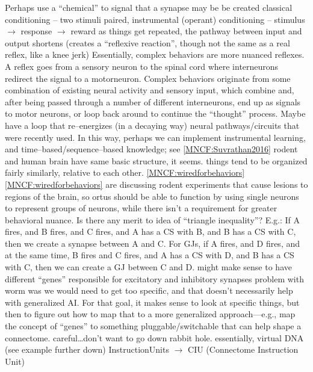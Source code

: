 \documentclass[11pt, a4paper, oneside]{article}   	%
\begin{document}
\begin{outline}
\point Perhaps use a ``chemical'' to signal that a synapse may be be created
\point classical conditioning -- two stimuli paired, instrumental (operant) conditioning -- stimulus $\rightarrow$ response $\rightarrow$ reward
\point as things get repeated, the pathway between input and output shortens (creates a ``reflexive reaction'', though not the same as a real reflex, like a knee jerk)
  \subpoint Essentially, complex behaviors are more nuanced reflexes. A reflex goes from a sensory neuron to the spinal cord where interneurons redirect the signal to a motorneuron. Complex behaviors originate from some combination of existing neural activity and sensory input, which combine and, after being passed through a number of different interneurons, end up as signals to motor neurons, or loop back around to continue the ``thought'' process.
  \point Maybe have a loop that re--energizes (in a decaying way) neural pathways/circuits that were recently used. In this way, perhaps we can implement instrumental learning, and time--based/sequence--based knowledge; see \ref{MNCF:Suvrathan2016}
\point rodent and human brain have same basic structure, it seems. things tend to be organized fairly similarly, relative to each other. \ref{MNCF:wiredforbehaviors}
\point \ref{MNCF:wiredforbehaviors} are discussing rodent experiments that cause lesions to regions of the brain, so ortus should be able to function by using single neurons to represent groups of neurons, while there isn't a requirement for greater behavioral nuance.
\point Is there any merit to idea of  ``triangle inequality''? E.g.:
    \subpoint If A fires, and B fires, and C fires, and A has a CS with B, and B has a CS with C, then we create a synapse between A and C.
    \subpoint For GJs, if A fires, and D fires, and at the same time, B fires and C fires, and A has a CS with D, and B has a CS with C, then we can create a GJ between C and D.
\point might make sense to have different ``genes'' responsible for excitatory and inhibitory synapses
\point problem with worm was we would need to get too specific, and that doesn't necessarily help with generalized AI. For that goal, it makes sense to look at specific things, but then to figure out how to map that to a more generalized approach---e.g., map the concept of ``genes'' to something pluggable/switchable that can help shape a connectome.
    \subpoint careful\ldots don't want to go down rabbit hole.
    \subpoint essentially, virtual DNA (see example further down)
        \subsubpoint InstructionUnits $\rightarrow$ CIU (Connectome Instruction Unit)

\end{outline}
\end{document}
